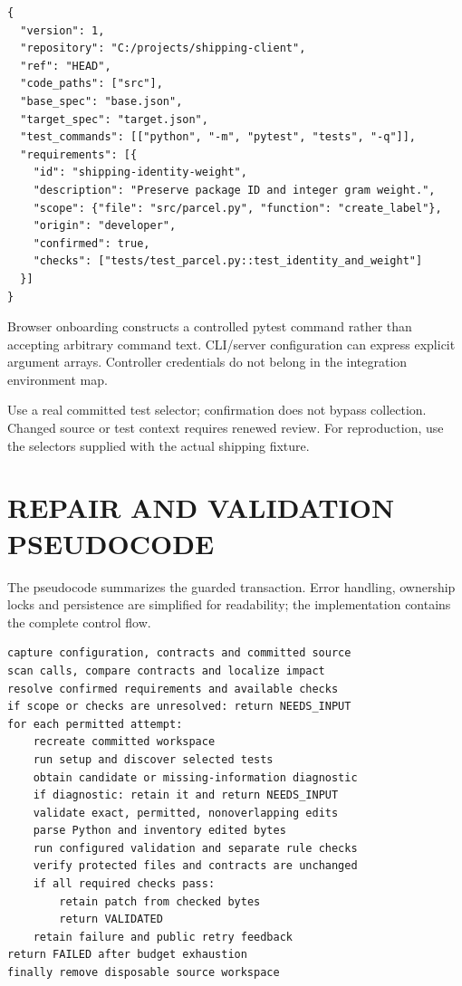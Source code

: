 \documentclass[12pt,a4paper,oneside]{report}
\begin{document}
\begin{Verbatim}[fontsize=\normalsize,fontfamily=\rmdefault,breaklines=true,breakanywhere=true]
{
  "version": 1,
  "repository": "C:/projects/shipping-client",
  "ref": "HEAD",
  "code_paths": ["src"],
  "base_spec": "base.json",
  "target_spec": "target.json",
  "test_commands": [["python", "-m", "pytest", "tests", "-q"]],
  "requirements": [{
    "id": "shipping-identity-weight",
    "description": "Preserve package ID and integer gram weight.",
    "scope": {"file": "src/parcel.py", "function": "create_label"},
    "origin": "developer",
    "confirmed": true,
    "checks": ["tests/test_parcel.py::test_identity_and_weight"]
  }]
}
\end{Verbatim}

Browser onboarding constructs a controlled pytest command rather than accepting arbitrary command text. CLI/server configuration can express explicit argument arrays. Controller credentials do not belong in the integration environment map.

Use a real committed test selector; confirmation does not bypass collection. Changed source or test context requires renewed review. For reproduction, use the selectors supplied with the actual shipping fixture.

\renewcommand{\chaptername}{APPENDIX}
\setcounter{chapter}{1}
\chapter{REPAIR AND VALIDATION PSEUDOCODE}

The pseudocode summarizes the guarded transaction. Error handling, ownership locks and persistence are simplified for readability; the implementation contains the complete control flow.

\begin{Verbatim}[fontsize=\normalsize,fontfamily=\rmdefault,breaklines=true,breakanywhere=true]
capture configuration, contracts and committed source
scan calls, compare contracts and localize impact
resolve confirmed requirements and available checks
if scope or checks are unresolved: return NEEDS_INPUT
for each permitted attempt:
    recreate committed workspace
    run setup and discover selected tests
    obtain candidate or missing-information diagnostic
    if diagnostic: retain it and return NEEDS_INPUT
    validate exact, permitted, nonoverlapping edits
    parse Python and inventory edited bytes
    run configured validation and separate rule checks
    verify protected files and contracts are unchanged
    if all required checks pass:
        retain patch from checked bytes
        return VALIDATED
    retain failure and public retry feedback
return FAILED after budget exhaustion
finally remove disposable source workspace
\end{Verbatim}
\end{document}
